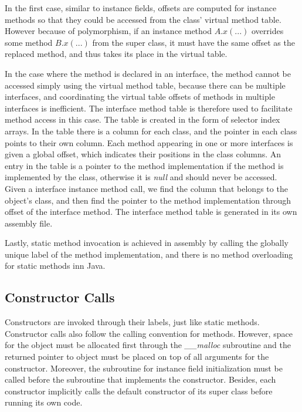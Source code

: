\documentclass[a4paper, notitlepage]{report}
\begin{document}
In the first case, similar to instance fields, offsets are computed for instance methods so that they could be accessed from the class' virtual method table. However because of polymorphism, if an instance method $A.x(...)$ overrides some method $B.x(...)$ from the super class, it must have the same offset as the replaced method, and thus takes its place in the virtual table. 

In the case where the method is declared in an interface, the method cannot be accessed simply using the virtual method table, because there can be multiple interfaces, and coordinating the virtual table offsets of methods in multiple interfaces is inefficient. The interface method table is therefore used to facilitate method access in this case. The table is created in the form of selector index arrays. In the table there is a column for each class, and the pointer in each class points to their own column. Each method appearing in one or more interfaces is given a global offset, which indicates their positions in the class columns. An entry in the table is a pointer to the method implementation if the method is implemented by the class, otherwise it is \emph{null} and should never be accessed. Given a interface instance method call, we find the column that belongs to the object's class, and then find the pointer to the method implementation through offset of the interface method. The interface method table is generated in its own assembly file.

Lastly, static method invocation is achieved in assembly by calling the globally unique label of the method implementation, and there is no method overloading for static methods inn Java.

\subsection{Constructor Calls}
\label{constructor_call}

Constructors are invoked through their labels, just like static methods. Constructor calls also follow the calling convention for methods. However, space for the object must be allocated first through the \emph{\_\_malloc} subroutine and the returned pointer to object must be placed on top of all arguments for the constructor. Moreover, the subroutine for instance field initialization must be called before the subroutine that implements the constructor. Besides, each constructor implicitly calls the default constructor of its super class before running its own code. 
\end{document}

